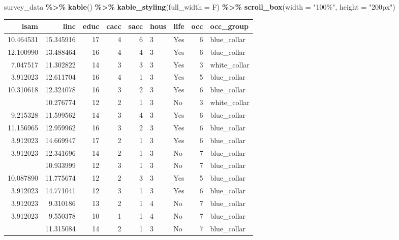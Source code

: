 \documentclass[
]{article}
\newenvironment{Shaded}{\begin{snugshade}}{\end{snugshade}}
\newcommand{\AttributeTok}[1]{\textcolor[rgb]{0.13,0.29,0.53}{#1}}
\newcommand{\FunctionTok}[1]{\textcolor[rgb]{0.13,0.29,0.53}{\textbf{#1}}}
\newcommand{\NormalTok}[1]{#1}
\newcommand{\SpecialCharTok}[1]{\textcolor[rgb]{0.81,0.36,0.00}{\textbf{#1}}}
\newcommand{\StringTok}[1]{\textcolor[rgb]{0.31,0.60,0.02}{#1}}
\begin{document}
\begin{Shaded}
\begin{Highlighting}[]
\NormalTok{survey\_data }\SpecialCharTok{\%\textgreater{}\%} 
  \FunctionTok{kable}\NormalTok{() }\SpecialCharTok{\%\textgreater{}\%} 
  \FunctionTok{kable\_styling}\NormalTok{(}\AttributeTok{full\_width =}\NormalTok{ F) }\SpecialCharTok{\%\textgreater{}\%} 
  \FunctionTok{scroll\_box}\NormalTok{(}\AttributeTok{width =} \StringTok{"100\%"}\NormalTok{, }\AttributeTok{height =} \StringTok{"200px"}\NormalTok{)}
\end{Highlighting}
\end{Shaded}

\begin{longtable}[t]{rrrrrllrl}
\toprule
lsam & linc & educ & cacc & sacc & hous & life & occ & occ\_group\\
\midrule
10.464531 & 15.345916 & 17 & 4 & 6 & 3 & Yes & 6 & blue\_collar\\
12.100990 & 13.488464 & 16 & 4 & 4 & 3 & Yes & 6 & blue\_collar\\
7.047517 & 11.302822 & 14 & 3 & 3 & 3 & Yes & 3 & white\_collar\\
3.912023 & 12.611704 & 16 & 4 & 1 & 3 & Yes & 5 & blue\_collar\\
10.310618 & 12.324078 & 16 & 3 & 2 & 3 & Yes & 6 & blue\_collar\\
\addlinespace
3.912023 & 10.276774 & 12 & 2 & 1 & 3 & No & 3 & white\_collar\\
9.215328 & 11.599562 & 14 & 3 & 4 & 3 & Yes & 6 & blue\_collar\\
11.156965 & 12.959962 & 16 & 3 & 2 & 3 & Yes & 6 & blue\_collar\\
3.912023 & 14.669947 & 17 & 2 & 1 & 3 & Yes & 6 & blue\_collar\\
3.912023 & 12.341696 & 14 & 2 & 1 & 3 & No & 7 & blue\_collar\\
\addlinespace
3.912023 & 10.933999 & 12 & 3 & 1 & 3 & No & 7 & blue\_collar\\
10.087890 & 11.775674 & 12 & 2 & 3 & 3 & Yes & 5 & blue\_collar\\
3.912023 & 14.771041 & 12 & 3 & 1 & 3 & Yes & 6 & blue\_collar\\
3.912023 & 9.310186 & 13 & 2 & 1 & 4 & No & 7 & blue\_collar\\
3.912023 & 9.550378 & 10 & 1 & 1 & 4 & No & 7 & blue\_collar\\
\addlinespace
3.912023 & 11.315084 & 14 & 2 & 1 & 3 & No & 7 & blue\_collar\\

\end{longtable}
\end{document}
